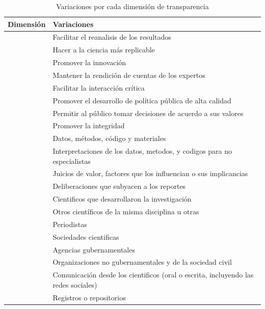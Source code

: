 \documentclass[
]{book}
\begin{document}
\begin{table}[!h]

\caption{\label{tab:tabtax}Variaciones por cada dimensión de transparencia}
\centering
\fontsize{10}{12}\selectfont
\begin{tabu} to 
\toprule
Dimensión & Variaciones\\
\midrule
 & Facilitar el reanalisis de los resultados\\
 & Hacer a la ciencia más replicable\\
 & Promover la innovación\\
 & Mantener la rendición de cuentas de los expertos\\
 & Facilitar la interacción crítica\\
 & Promover el desarrollo de política pública de alta calidad\\
 & Permitir al público tomar decisiones de acuerdo a sus valores\\
 & Promover la integridad\\
 & Datos, métodos, código y materiales\\
 & Interpretaciones de los datos, metodos, y codigos para no especialistas\\
 & Juicios de valor, factores que los influencian o sus implicancias\\
 & Deliberaciones que subyacen a los reportes\\
 & Cientificos que desarrollaron la investigación\\
 & Otros científicos de la misma disciplina u otras\\
 & Periodistas\\
 & Sociedades cientificas\\
 & Agencias gubernamentales\\
 & Organizaciones no gubernamentales y de la sociedad civil\\
 & Comunicación desde los cientificos (oral o escrita, incluyendo las redes sociales)\\
 & Registros o repositorios\\

\end{tabu}
\end{table}
\end{document}
